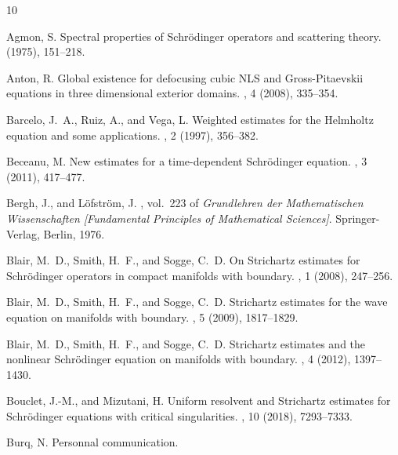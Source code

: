 \documentclass[10pt,leqno]{amsart}
\theoremstyle{definition}%
\theoremstyle{remark}
\numberwithin{equation}{section}
\renewcommand{\^}{\widehat}%
\begin{document}
\begin{thebibliography}{10}

{\sc Agmon, S.}
\newblock Spectral properties of {Schr{\"o}dinger} operators and scattering
  theory.
 (1975),
  151--218.

{\sc Anton, R.}
\newblock Global existence for defocusing cubic {NLS} and {Gross}-{Pitaevskii}
  equations in three dimensional exterior domains.
, 4 (2008), 335--354.

{\sc Barcelo, J.~A., Ruiz, A., and Vega, L.}
\newblock Weighted estimates for the {Helmholtz} equation and some
  applications.
, 2 (1997), 356--382.

{\sc Beceanu, M.}
\newblock New estimates for a time-dependent {Schr{\"o}dinger} equation.
, 3 (2011), 417--477.

{\sc Bergh, J., and L{\"o}fstr{\"o}m, J.}
, vol.~223 of {\em
  Grundlehren der Mathematischen Wissenschaften [Fundamental Principles of
  Mathematical Sciences]}.
\newblock Springer-Verlag, Berlin, 1976.

{\sc Blair, M.~D., Smith, H.~F., and Sogge, C.~D.}
\newblock On {Strichartz} estimates for {Schr{\"o}dinger} operators in compact
  manifolds with boundary.
, 1 (2008), 247--256.

{\sc Blair, M.~D., Smith, H.~F., and Sogge, C.~D.}
\newblock Strichartz estimates for the wave equation on manifolds with
  boundary.
, 5 (2009),
  1817--1829.

{\sc Blair, M.~D., Smith, H.~F., and Sogge, C.~D.}
\newblock Strichartz estimates and the nonlinear {Schr{\"o}dinger} equation on
  manifolds with boundary.
, 4 (2012), 1397--1430.

{\sc Bouclet, J.-M., and Mizutani, H.}
\newblock Uniform resolvent and {Strichartz} estimates for {Schr{\"o}dinger}
  equations with critical singularities.
, 10 (2018), 7293--7333.

{\sc Burq, N.}
\newblock Personnal communication.


\end{thebibliography}
\end{document}
